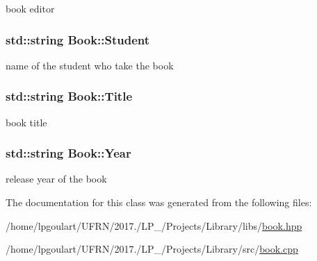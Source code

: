 book editor 

\subsubsection[{\texorpdfstring{Student}{Student}}]{\setlength{\rightskip}{0pt plus 5cm}std\+::string Book\+::\+Student\hspace{0.3cm}{\ttfamily [private]}}\hypertarget{classBook_ae89daf9343a917dced86da884961ed3a}{}\label{classBook_ae89daf9343a917dced86da884961ed3a}


name of the student who take the book 

\subsubsection[{\texorpdfstring{Title}{Title}}]{\setlength{\rightskip}{0pt plus 5cm}std\+::string Book\+::\+Title\hspace{0.3cm}{\ttfamily [private]}}\hypertarget{classBook_a862b94a2fd16ac90209afa4393d8df8a}{}\label{classBook_a862b94a2fd16ac90209afa4393d8df8a}


book title 

\subsubsection[{\texorpdfstring{Year}{Year}}]{\setlength{\rightskip}{0pt plus 5cm}std\+::string Book\+::\+Year\hspace{0.3cm}{\ttfamily [private]}}\hypertarget{classBook_ad3fc2c944e788d179c4d836f36662ae2}{}\label{classBook_ad3fc2c944e788d179c4d836f36662ae2}


release year of the book 



The documentation for this class was generated from the following files\+:\begin{DoxyCompactItemize}
\item 
/home/lpgoulart/\+U\+F\+R\+N/2017./\+L\+P\+\_/\+Projects/\+Library/libs/\hyperlink{book_8hpp}{book.\+hpp}\item 
/home/lpgoulart/\+U\+F\+R\+N/2017./\+L\+P\+\_/\+Projects/\+Library/src/\hyperlink{book_8cpp}{book.\+cpp}\end{DoxyCompactItemize}
